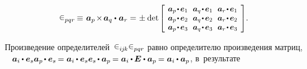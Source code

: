 \begin{otherlanguage}{russian}
\nopagebreak\vspace{-0.4em}\begin{equation*}
\levicivita_{pqr} \hspace{-0.15ex}
\equiv \hspace{.16ex} \bm{a}_p \hspace{-0.25ex} \times \hspace{-0.25ex} \bm{a}_q \dotp \hspace{.1ex} \bm{a}_r =
\hspace{.1ex} \pm \hspace{.1ex} \operatorname{det}\hspace{-0.1ex}
\scalebox{0.92}[0.92]{$\left[\hspace{-0.2ex}\begin{array}{c@{\hspace{.64em}}c@{\hspace{.64em}}c}
\bm{a}_p \narrowdotp\hspace{.12ex} \bm{e}_1 & \bm{a}_q \narrowdotp\hspace{.12ex} \bm{e}_1 & \bm{a}_r \narrowdotp\hspace{.12ex} \bm{e}_1 \\
\bm{a}_p \narrowdotp\hspace{.12ex} \bm{e}_2 & \bm{a}_q \narrowdotp\hspace{.12ex} \bm{e}_2 & \bm{a}_r \narrowdotp\hspace{.12ex} \bm{e}_2 \\
\bm{a}_p \narrowdotp\hspace{.12ex} \bm{e}_3 & \bm{a}_q \narrowdotp\hspace{.12ex} \bm{e}_3 & \bm{a}_r \narrowdotp\hspace{.12ex} \bm{e}_3
\end{array}\hspace{-0.12ex}\right]$} .
\end{equation*}

\vspace{.1em}\noindent
Произведение определителей~${\levicivita_{i\hspace{-0.1ex}j\hspace{-0.1ex}k} \levicivita_{pqr}}$ равно определителю произведения матриц, ~\ru{\:---}  
${\bm{a}_i \hspace{-0.1ex} \dotp \bm{e}_s \bm{a}_p \hspace{-0.2ex} \dotp \bm{e}_s \hspace{-0.2ex}
= \bm{a}_i \hspace{-0.1ex} \dotp \bm{e}_s \bm{e}_s \hspace{-0.2ex} \dotp \bm{a}_p \hspace{-0.15ex}
= \bm{a}_i \hspace{-0.1ex} \dotp \hspace{-0.1ex} \UnitDyad \dotp \bm{a}_p \hspace{-0.15ex}
= \bm{a}_i \hspace{-0.1ex} \dotp \bm{a}_p}$, в~результате


\end{otherlanguage}
